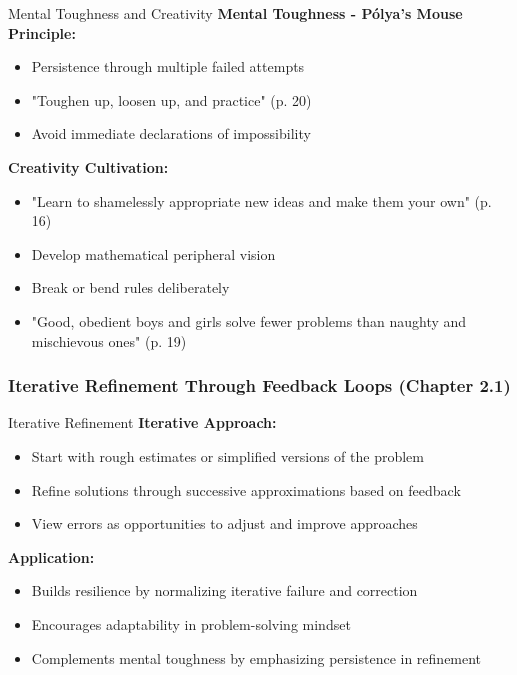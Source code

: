 \documentclass[12pt]{article}
\begin{document}
	\begin{strategybox}{Mental Toughness and Creativity}
		\textbf{Mental Toughness - Pólya's Mouse Principle:}
		\begin{itemize}
			\item Persistence through multiple failed attempts
			\item "Toughen up, loosen up, and practice" (p. 20)
			\item Avoid immediate declarations of impossibility
		\end{itemize}
		
		\textbf{Creativity Cultivation:}
		\begin{itemize}
			\item "Learn to shamelessly appropriate new ideas and make them your own" (p. 16)
			\item Develop mathematical peripheral vision
			\item Break or bend rules deliberately
			\item "Good, obedient boys and girls solve fewer problems than naughty and mischievous ones" (p. 19)
		\end{itemize}
	\end{strategybox}
	
	\subsubsection{Iterative Refinement Through Feedback Loops (Chapter 2.1)}
	
	\begin{strategybox}{Iterative Refinement}
		\textbf{Iterative Approach:}
		\begin{itemize}
			\item Start with rough estimates or simplified versions of the problem
			\item Refine solutions through successive approximations based on feedback
			\item View errors as opportunities to adjust and improve approaches
		\end{itemize}
		
		\textbf{Application:}
		\begin{itemize}
			\item Builds resilience by normalizing iterative failure and correction
			\item Encourages adaptability in problem-solving mindset
			\item Complements mental toughness by emphasizing persistence in refinement
		\end{itemize}
	\end{strategybox}
	
\end{document}
